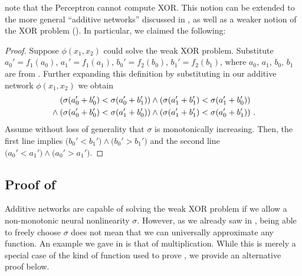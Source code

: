  note that the Perceptron cannot compute XOR.
This notion can be extended to the more general \enquote{additive networks} discussed in , as well as a weaker notion of the XOR problem ().
In particular, we claimed the following:

\ThmWeakXor*

\begin{proof}
Suppose $\phi(x_1, x_2)$ could solve the weak XOR problem. Substitute $a_0' = f_1(a_0)$, $a_1' = f_1(a_1)$, $b_0' = f_2(b_0)$, $b_1' = f_2(b_1)$, where $a_0$, $a_1$, $b_0$, $b_1$ are from .
Further expanding this definition by substituting in our additive network $\phi(x_1, x_2)$ we obtain
	\begin{align*}
	&\hphantom{\wedge} \;    \left( \sigma(a_0' + b_0') < \sigma(a_0' + b_1') \right)
	 \wedge   \left( \sigma(a_1' + b_1') < \sigma(a_1' + b_0') \right) \\
	&\wedge   \left( \sigma(a_0' + b_0') < \sigma(a_1' + b_0') \right) 
	 \wedge   \left( \sigma(a_1' + b_1') < \sigma(a_0' + b_1') \right) \,.
	\end{align*}
	Assume without loss of generality that $\sigma$ is monotonically increasing. Then, the first line implies $\big(b_0' < b_1' \big) \wedge \big( b_0' > b_1' \big)$ and the second line $\big(a_0' < a_1' \big) \wedge \big( a_0' > a_1' \big)$. \Lightning
\end{proof}

\subsection{Proof of }
\label{app:thm_multiplication}

Additive networks are capable of solving the weak XOR problem if we allow a non-monotonic neural nonlinearity $\sigma$.
However, as we already saw in , being able to freely choose $\sigma$ does not mean that we can universally approximate any function.
An example we gave in  is that of multiplication.
While this is merely a special case of the kind of function used to prove , we provide an alternative proof below.

\ThmMultiplication*

